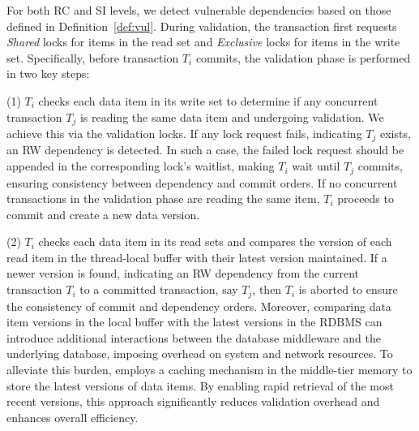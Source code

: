 For both RC and SI levels, we detect vulnerable dependencies based on those defined in Definition~\ref{def:vul}.  
During validation, the transaction first requests \textit{Shared} locks for items in the read set and \textit{Exclusive} locks for items in the write set. Specifically, before transaction $T_i$ commits,  the validation phase is performed in two key steps:

(1) $T_i$ checks each data item in its write set to determine if any concurrent transaction $T_j$ is reading the same data item and undergoing validation. 
We achieve this via the validation locks. 
If any lock request fails, indicating $T_j$ exists, an RW dependency is detected. 
In such a case, the failed lock request should be appended in the corresponding lock's waitlist, making $T_i$ wait until $T_j$ commits, ensuring consistency between dependency and commit orders.  
If no concurrent transactions in the validation phase are reading the same item, $T_i$ proceeds to commit and create a new data version. 

(2) $T_i$ checks each data item in its read sets and compares the version of each read item in the thread-local buffer with their latest version maintained. If a newer version is found, indicating an RW dependency from the current transaction $T_i$ to a committed transaction, say $T_j$, then $T_i$ is aborted to 
ensure the consistency of commit and dependency orders. Moreover, comparing data item versions in the local buffer with the latest versions in the RDBMS can introduce additional interactions between the database middleware and the underlying database, imposing overhead on system and network resources. To alleviate this burden, \sysname employs a caching mechanism in the middle-tier memory to store the latest versions of data items. By enabling rapid retrieval of the most recent versions, this approach significantly reduces validation overhead and enhances overall efficiency. 

